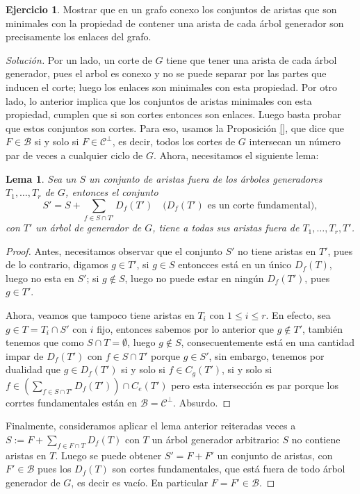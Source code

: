 \documentclass[12pt]{report}
\theoremstyle{plain}
\newtheorem{lemma}[theorem]{Lema}
\theoremstyle{definition}
\newtheorem{exercise}[theorem]{Ejercicio}
\newenvironment{solution}{\begin{proof}[Solución]}{\end{proof}}
\begin{document}
\begin{exercise}
    Mostrar que en un grafo conexo los conjuntos de aristas que son minimales con la propiedad de contener una arista
     de cada árbol generador son precisamente los enlaces del grafo.
\end{exercise}
\begin{solution}
    Por un lado, un corte de $G$ tiene que tener una arista de cada árbol generador, pues el arbol es conexo y no se
    puede separar por las partes que inducen el corte; luego los enlaces son minimales con esta propiedad. Por otro
    lado, lo anterior implica que los conjuntos de aristas minimales con esta propiedad, cumplen que si son cortes
    entonces son enlaces. Luego basta probar que estos conjuntos son cortes. Para eso, usamos la Proposición \ref{},
    que dice que $F \in \mathcal B$ si y solo si $F \in \mathcal C ^\perp$, es decir, todos los cortes de $G$
    intersecan un número  par de veces a cualquier ciclo de $G$. Ahora, necesitamos el siguiente lema:
    \begin{lemma}
        Sea un $S$ un conjunto de aristas fuera de los árboles generadores $T_1,\ldots,T_r$ de $G$, entonces el conjunto
        $$
        S' = S + \sum_{f \in S \cap T'} D_f ( T') \quad \text{($D_f (T')$ es un corte fundamental)},
        $$
        con $T'$ un árbol de generador de $G$, tiene a todas sus aristas fuera de $T_1,\ldots,T_r,T'$.
    \end{lemma}
    \begin{proof}
        Antes, necesitamos observar que el conjunto $S'$ no tiene aristas en $T'$, pues de lo contrario, digamos $g \in T'$, si $g \in S$ entoncces está en un único $D_f (T)$, luego no esta en $S'$; si $g \not \in S$, luego no puede estar en ningún $D_f (T')$, pues $g \in T'$.

        Ahora, veamos que tampoco tiene aristas en $T_i$ con $1 \leq i \leq r$. En efecto, sea $g \in T = T_i \cap S'$
        con $i$ fijo, entonces sabemos por lo anterior que $g \not \in T'$, también tenemos que como $S  \cap T = \emptyset$, luego $g \not \in S$, consecuentemente  está en una
        cantidad impar de $
        D_f(T'
        )$ con $f \in S \cap T'$ porque $g \in S'$, sin embargo, tenemos por dualidad que $g \in D_f(T')$ si y solo
        si $f \in C_g (T')$, si y solo si $f \in \left (\sum_{f \in S \cap T'} D_f (T') \right ) \cap C_e (T')$ pero
        esta intersección es par porque los corrtes fundamentales están en $\mathcal B = \mathcal C^\perp$. Absurdo.
    \end{proof}

    Finalmente, consideramos aplicar el lema anterior reiteradas veces a $S := F + \sum_{f \in F \cap T} D_{f} (T)$
    con $T$ un árbol generador arbitrario: $S$ no contiene aristas en $T$. Luego se puede obtener $S' = F + F'$ un
    conjunto de
     aristas, con $F' \in \mathcal B$ pues los $D_f(T)$ son cortes fundamentales, que está fuera de todo árbol
     generador de $G$, es decir es vacío. En particular $F = F' \in \mathcal B$.
\end{solution}
\end{document}
